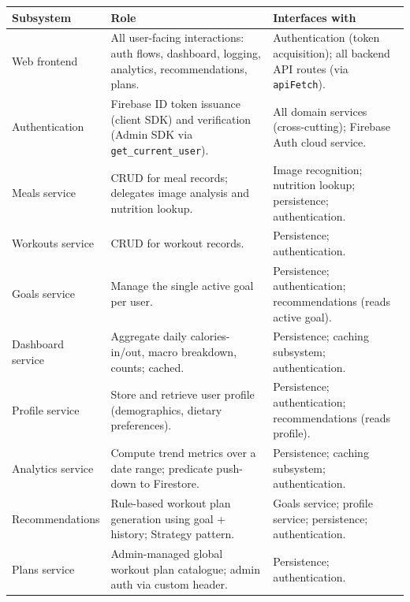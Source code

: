 \documentclass[11pt]{article}
\begin{document}
\begin{longtable}{p{3.5cm} p{5.5cm} p{5.2cm}}
  \toprule
  \textbf{Subsystem} & \textbf{Role} & \textbf{Interfaces with} \\
  \midrule
  \endhead

  Web frontend
  & All user-facing interactions: auth flows, dashboard, logging, analytics, recommendations, plans.
  & Authentication (token acquisition); all backend API routes (via \texttt{apiFetch}). \\

  Authentication
  & Firebase ID token issuance (client SDK) and verification (Admin SDK via
    \texttt{get\_current\_user}).
  & All domain services (cross-cutting); Firebase Auth cloud service. \\

  Meals service
  & CRUD for meal records; delegates image analysis and nutrition lookup.
  & Image recognition; nutrition lookup; persistence; authentication. \\

  Workouts service
  & CRUD for workout records.
  & Persistence; authentication. \\

  Goals service
  & Manage the single active goal per user.
  & Persistence; authentication; recommendations (reads active goal). \\

  Dashboard service
  & Aggregate daily calories-in/out, macro breakdown, counts; cached.
  & Persistence; caching subsystem; authentication. \\

  Profile service
  & Store and retrieve user profile (demographics, dietary preferences).
  & Persistence; authentication; recommendations (reads profile). \\

  Analytics service
  & Compute trend metrics over a date range; predicate push-down to Firestore.
  & Persistence; caching subsystem; authentication. \\

  Recommendations
  & Rule-based workout plan generation using goal + history; Strategy pattern.
  & Goals service; profile service; persistence; authentication. \\

  Plans service
  & Admin-managed global workout plan catalogue; admin auth via custom header.
  & Persistence; authentication. \\


\end{longtable}
\end{document}
